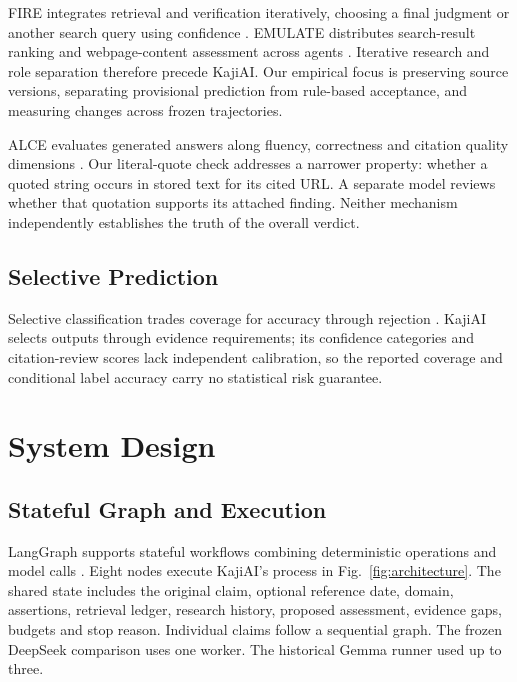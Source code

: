 \documentclass[conference]{IEEEtran}
\begin{document}
FIRE integrates retrieval and verification iteratively, choosing a final judgment or another search query using confidence \cite{fire}. EMULATE distributes search-result ranking and webpage-content assessment across agents \cite{emulate}. Iterative research and role separation therefore precede KajiAI. Our empirical focus is preserving source versions, separating provisional prediction from rule-based acceptance, and measuring changes across frozen trajectories.

ALCE evaluates generated answers along fluency, correctness and citation quality dimensions \cite{alce}. Our literal-quote check addresses a narrower property: whether a quoted string occurs in stored text for its cited URL. A separate model reviews whether that quotation supports its attached finding. Neither mechanism independently establishes the truth of the overall verdict.

\subsection{Selective Prediction}
Selective classification trades coverage for accuracy through rejection \cite{selective}. KajiAI selects outputs through evidence requirements; its confidence categories and citation-review scores lack independent calibration, so the reported coverage and conditional label accuracy carry no statistical risk guarantee.

\section{System Design}
\subsection{Stateful Graph and Execution}
LangGraph supports stateful workflows combining deterministic operations and model calls \cite{langgraph}. Eight nodes execute KajiAI's process in Fig.~\ref{fig:architecture}. The shared state includes the original claim, optional reference date, domain, assertions, retrieval ledger, research history, proposed assessment, evidence gaps, budgets and stop reason. Individual claims follow a sequential graph. The frozen DeepSeek comparison uses one worker. The historical Gemma runner used up to three.
\end{document}
